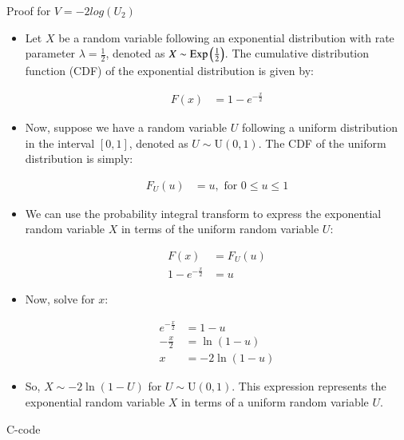 \documentclass{beamer}
\begin{document}
\begin{frame}[allowframebreaks]{Proof for $V = -2log(U_2)$}
  \begin{itemize} 
  \item Let $X$ be a random variable following an exponential distribution with rate parameter $\lambda = \frac{1}{2}$, denoted as $X \sim \text{Exp}\left(\frac{1}{2}\right)$. The cumulative distribution function (CDF) of the exponential distribution is given by:

\begin{align}
F(x) &= 1 - e^{-\frac{x}{2}}
\end{align}

\item Now, suppose we have a random variable $U$ following a uniform distribution in the interval $[0, 1]$, denoted as $U \sim \text{U}(0, 1)$. The CDF of the uniform distribution is simply:

\begin{align}
F_U(u) &= u, \text{ for } 0 \leq u \leq 1
\end{align}

\item We can use the probability integral transform to express the exponential random variable $X$ in terms of the uniform random variable $U$:

\begin{align}
F(x) &= F_U(u) \\
1 - e^{-\frac{x}{2}} &= u
\end{align}

\item Now, solve for $x$:

\begin{align}
e^{-\frac{x}{2}} &= 1 - u \\
-\frac{x}{2} &= \ln(1 - u) \\
x &= -2 \ln(1 - u)
\end{align}

\item So, $X \sim -2 \ln(1 - U)$ for $U \sim \text{U}(0, 1)$. This expression represents the exponential random variable $X$ in terms of a uniform random variable $U$.
  \end{itemize}
\end{frame}

\begin{frame}[allowframebreaks]{C-code}
  
\end{frame}
\end{document}
